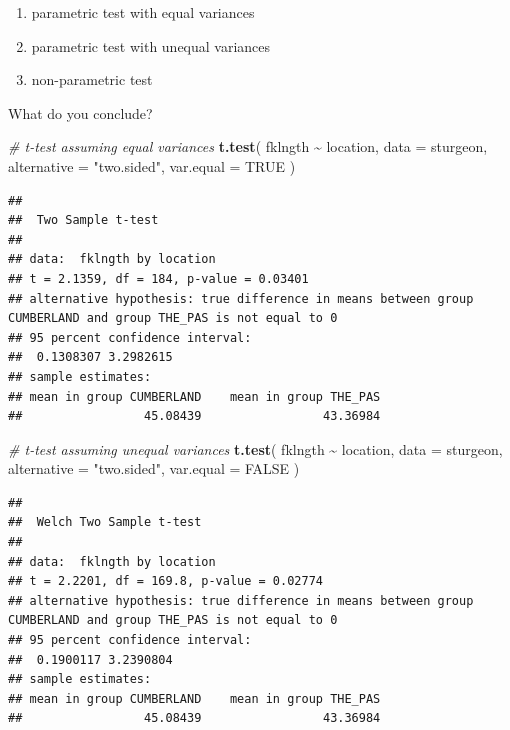 \documentclass[
  12pt,
]{book}
\newenvironment{Shaded}{\begin{snugshade}}{\end{snugshade}}
\newcommand{\CommentTok}[1]{\textcolor[rgb]{0.56,0.35,0.01}{\textit{#1}}}
\newcommand{\DataTypeTok}[1]{\textcolor[rgb]{0.13,0.29,0.53}{#1}}
\newcommand{\KeywordTok}[1]{\textcolor[rgb]{0.13,0.29,0.53}{\textbf{#1}}}
\newcommand{\NormalTok}[1]{#1}
\newcommand{\OperatorTok}[1]{\textcolor[rgb]{0.81,0.36,0.00}{\textbf{#1}}}
\newcommand{\OtherTok}[1]{\textcolor[rgb]{0.56,0.35,0.01}{#1}}
\newcommand{\StringTok}[1]{\textcolor[rgb]{0.31,0.60,0.02}{#1}}
\providecommand{\tightlist}{%
  \setlength{\itemsep}{0pt}\setlength{\parskip}{0pt}}
\begin{document}
\begin{enumerate}
\def\labelenumi{\arabic{enumi}.}
\tightlist
\item
  parametric test with equal variances
\item
  parametric test with unequal variances
\item
  non-parametric test
\end{enumerate}

What do you conclude?

\begin{Shaded}
\begin{Highlighting}[]
\CommentTok{\# t{-}test assuming equal variances}
\KeywordTok{t.test}\NormalTok{(}
\NormalTok{  fklngth }\OperatorTok{\textasciitilde{}}\StringTok{ }\NormalTok{location,}
  \DataTypeTok{data =}\NormalTok{ sturgeon,}
  \DataTypeTok{alternative =} \StringTok{"two.sided"}\NormalTok{,}
  \DataTypeTok{var.equal =} \OtherTok{TRUE}
\NormalTok{)}
\end{Highlighting}
\end{Shaded}

\begin{verbatim}
## 
##  Two Sample t-test
## 
## data:  fklngth by location
## t = 2.1359, df = 184, p-value = 0.03401
## alternative hypothesis: true difference in means between group CUMBERLAND and group THE_PAS is not equal to 0
## 95 percent confidence interval:
##  0.1308307 3.2982615
## sample estimates:
## mean in group CUMBERLAND    mean in group THE_PAS 
##                 45.08439                 43.36984
\end{verbatim}

\begin{Shaded}
\begin{Highlighting}[]
\CommentTok{\# t{-}test assuming unequal variances}
\KeywordTok{t.test}\NormalTok{(}
\NormalTok{  fklngth }\OperatorTok{\textasciitilde{}}\StringTok{ }\NormalTok{location,}
  \DataTypeTok{data =}\NormalTok{ sturgeon,}
  \DataTypeTok{alternative =} \StringTok{"two.sided"}\NormalTok{,}
  \DataTypeTok{var.equal =} \OtherTok{FALSE}
\NormalTok{)}
\end{Highlighting}
\end{Shaded}

\begin{verbatim}
## 
##  Welch Two Sample t-test
## 
## data:  fklngth by location
## t = 2.2201, df = 169.8, p-value = 0.02774
## alternative hypothesis: true difference in means between group CUMBERLAND and group THE_PAS is not equal to 0
## 95 percent confidence interval:
##  0.1900117 3.2390804
## sample estimates:
## mean in group CUMBERLAND    mean in group THE_PAS 
##                 45.08439                 43.36984
\end{verbatim}
\end{document}
